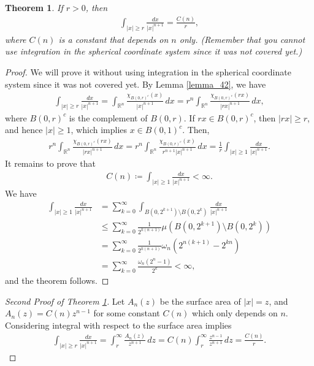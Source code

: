 \documentclass[11pt]{book}
\newtheorem{theorem}{Theorem}[chapter]
\theoremstyle{definition}
\numberwithin{equation}{chapter}
\begin{document}
\begin{theorem}\label{theorem_416}
If $r > 0$, then
\begin{align*}
    \int_{\left|x\right| \geq r} \frac{dx}{\left|x\right|^{n+1}} = \frac{C(n)}{r},
\end{align*}
where $C(n)$ is a constant that depends on $n$ only. (Remember that you cannot use integration in the spherical coordinate system since it was not covered yet.)
\end{theorem}
\begin{proof}
We will prove it without using integration in the spherical coordinate system since it was not covered yet. By Lemma \ref{lemma_42}, we have
\begin{align*}
    \int_{\left|x\right| \geq r} \frac{dx}{ \left|x\right|^{n+1}} = \int_{\mathbb{R}^n} \frac{\chi_{B(0,r)^c}(x)}{\left|x\right|^{n+1}} \,dx = r^n \int_{\mathbb{R}^n} \frac{\chi_{B(0,r)^c}(rx)}{\left|rx\right|^{n+1}} \,dx,
\end{align*}
where $B(0,r)^c$ is the complement of $B(0,r)$. If $rx \in B(0,r)^c$, then $\left|rx\right| \geq r$, and hence $\left|x\right| \geq 1$, which implies $x \in B(0,1)^c$. Then,
\begin{align*}
    r^n \int_{\mathbb{R}^n} \frac{\chi_{B(0,r)^c}(rx)}{\left|rx\right|^{n+1}} \,dx = r^n \int_{\mathbb{R}^n} \frac{\chi_{B(0,r)^c}(x)}{r^{n+1}\left|x\right|^{n+1}} \,dx = \frac{1}{r} \int_{\left|x\right|\geq 1} \frac{dx}{\left|x\right|^{n+1}}.
\end{align*}
It remains to prove that 
\begin{align*}
    C(n) \coloneqq \int_{\left|x\right|\geq 1} \frac{dx}{\left|x\right|^{n+1}} < \infty.
\end{align*}
We have
\begin{align*}
    \int_{\left|x\right|\geq 1} \frac{dx}{\left|x\right|^{n+1}} & = \sum^\infty_{k=0} \int_{B(0,2^{k+1}) \setminus B(0,2^k)} \frac{dx}{\left|x\right|^{n+1}} \\
    & \leq \sum^\infty_{k=0} \frac{1}{2^{k(n+1)}} \mu\left(B(0,2^{k+1}) \setminus B(0,2^k)\right) \\
    & = \sum^\infty_{k=0} \frac{1}{2^{k(n+1)}} \omega_n \left(2^{n(k+1)} - 2^{kn}\right) \\
    & = \sum^\infty_{k=0} \frac{\omega_n (2^n - 1)}{2^k} < \infty,
\end{align*}
and the theorem follows.
\end{proof}

\medskip

\begin{proof}[Second Proof of Theorem \ref{theorem_416}]
Let $A_n(z)$ be the surface area of $\left|x\right| = z$, and $A_n(z) = C(n) z^{n-1}$ for some constant $C(n)$ which only depends on $n$. Considering integral with respect to the surface area implies
\begin{align*}
    \int_{\left|x\right| \geq r} \frac{dx}{\left|x\right|^{n+1}} = \int^\infty_r \frac{A_n(z)}{z^{n+1}} \,dz = C(n) \int^\infty_r \frac{z^{n-1}}{z^{n+1}} \,dz = \frac{C(n)}{r}.
\end{align*}
\end{proof}
\end{document}
